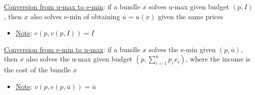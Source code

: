 \documentclass{article}
\begin{document}
  \par
  \underline{Conversion from u-max to e-min}: if a bundle $x$ solves u-max given budget $(p, I)$, then $x$ also solves e-min of obtaining $\overline{u} = u(x)$ given the same prices
  \begin{itemize}
    \item  \underline{Note}: $e(p, v(p, I)) = I$
  \end{itemize}
  \par
  \underline{Conversion from e-min to u-max}: if a bundle $x$ solves the e-min given $(p, \overline{u})$, then $x$ also solves the u-max given budget $(p, \sum_{i=1}^{n}p_{i}x_{i})$, where the income is the cost of the bundle $x$
  \begin{itemize}
    \item  \underline{Note}: $v(p, e(p, \overline{u})) = \overline{u}$
  \end{itemize}
  \par
\vspace{6mm}
\end{document}
